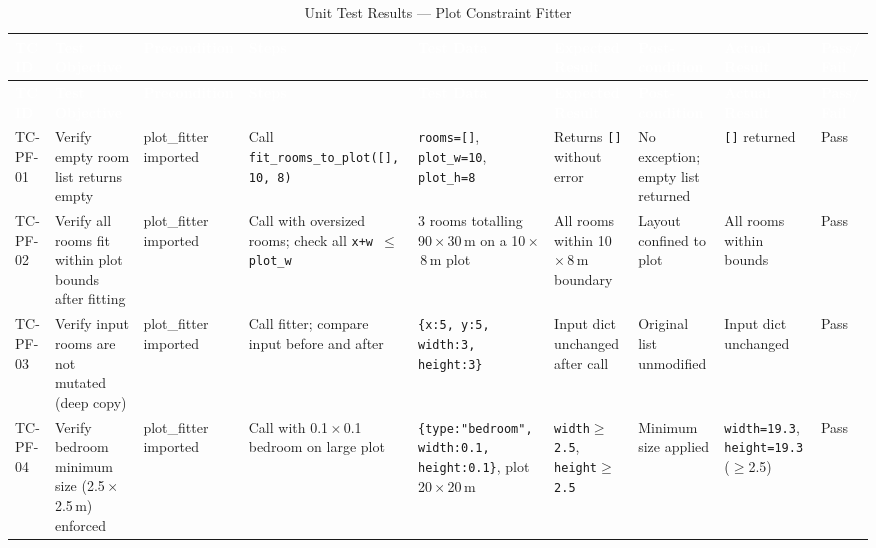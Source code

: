 \begin{landscape}
\small
\begin{longtable}{|p{1.4cm}|p{3.2cm}|p{2.8cm}|p{2.8cm}|p{2.8cm}|p{2.8cm}|p{2.6cm}|p{2.8cm}|p{1.0cm}|}
\caption{Unit Test Results — Plot Constraint Fitter} \label{tab:pf} \\
\hline
\rowcolor{tableheader}
\textcolor{white}{\textbf{TC ID}} &
\textcolor{white}{\textbf{Test Objective}} &
\textcolor{white}{\textbf{Precondition}} &
\textcolor{white}{\textbf{Steps}} &
\textcolor{white}{\textbf{Test Data}} &
\textcolor{white}{\textbf{Expected Result}} &
\textcolor{white}{\textbf{Post-condition}} &
\textcolor{white}{\textbf{Actual Result}} &
\textcolor{white}{\textbf{Pass/ Fail}} \\
\hline
\endfirsthead
\hline
\rowcolor{tableheader}
\textcolor{white}{\textbf{TC ID}} &
\textcolor{white}{\textbf{Test Objective}} &
\textcolor{white}{\textbf{Precondition}} &
\textcolor{white}{\textbf{Steps}} &
\textcolor{white}{\textbf{Test Data}} &
\textcolor{white}{\textbf{Expected Result}} &
\textcolor{white}{\textbf{Post-condition}} &
\textcolor{white}{\textbf{Actual Result}} &
\textcolor{white}{\textbf{Pass/ Fail}} \\
\hline
\endhead

\rowcolor{passgreen}
TC-PF-01 & Verify empty room list returns empty & plot\_fitter imported & Call \texttt{fit\_rooms\_to\_plot([], 10, 8)} & \texttt{rooms=[]}, \texttt{plot\_w=10}, \texttt{plot\_h=8} & Returns \texttt{[]} without error & No exception; empty list returned & \texttt{[]} returned & Pass \\ \hline

\rowcolor{passgreen}
TC-PF-02 & Verify all rooms fit within plot bounds after fitting & plot\_fitter imported & Call with oversized rooms; check all \texttt{x+w $\leq$ plot\_w} & 3 rooms totalling 90\,$\times$\,30\,m on a 10\,$\times$\,8\,m plot & All rooms within 10\,$\times$\,8\,m boundary & Layout confined to plot & All rooms within bounds & Pass \\ \hline

\rowcolor{passgreen}
TC-PF-03 & Verify input rooms are not mutated (deep copy) & plot\_fitter imported & Call fitter; compare input before and after & \texttt{\{x:5, y:5, width:3, height:3\}} & Input dict unchanged after call & Original list unmodified & Input dict unchanged & Pass \\ \hline

\rowcolor{passgreen}
TC-PF-04 & Verify bedroom minimum size (2.5\,$\times$\,2.5\,m) enforced & plot\_fitter imported & Call with 0.1\,$\times$\,0.1 bedroom on large plot & \texttt{\{type:"bedroom", width:0.1, height:0.1\}}, plot 20\,$\times$\,20\,m & \texttt{width$\geq$2.5}, \texttt{height$\geq$2.5} & Minimum size applied & \texttt{width=19.3}, \texttt{height=19.3} ($\geq$2.5) & Pass \\ \hline


\end{longtable}
\end{landscape}
